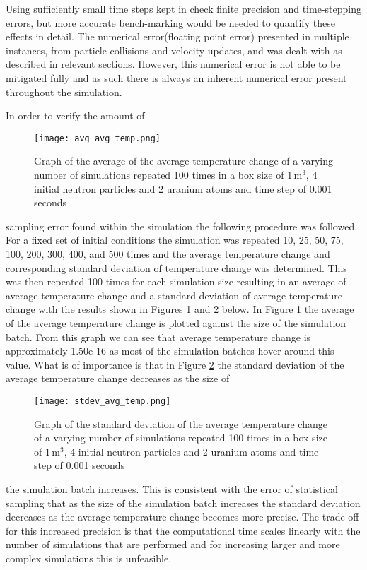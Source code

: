 \documentclass[twocolumn, 11pt]{article}
\begin{document}
Using sufficiently small time steps kept in check finite precision and time-stepping errors, but more accurate bench-marking would be needed to quantify these effects in detail. The numerical error(floating point error) presented in multiple instances, from particle collisions and velocity updates, and was dealt with as described in relevant sections. However, this numerical error is not able to be mitigated fully and as such there is always an inherent numerical error present throughout the simulation. 

In order to verify the amount of 
\begin{figure}[h]
    \centering
    \texttt{[image: avg\_avg\_temp.png]}
    \caption{Graph of the average of the average temperature change of a varying number of simulations repeated 100 times in a box size of \(1 \,\text{m}^3\), 4 initial neutron particles and 2 uranium atoms and time step of 0.001 seconds}
    \label{fig:avg_avg_analysis}
\end{figure}
sampling error found within the simulation the following procedure was followed. For a fixed set of initial conditions the simulation was repeated 10, 25, 50, 75, 100, 200, 300, 400, and 500 times and the average temperature change and corresponding standard deviation of temperature change was determined. This was then repeated 100 times for each simulation size resulting in an average of average temperature change and a standard deviation of average temperature change with the results shown in Figures \ref{fig:avg_avg_analysis} and \ref{fig:stdev_avg_analysis} below.
In Figure \ref{fig:avg_avg_analysis} the average of the average temperature change is plotted against the size of the simulation batch. From this graph we can see that average temperature change is approximately 1.50e-16 as most of the simulation batches hover around this value. What is of importance is that in Figure \ref{fig:stdev_avg_analysis} the standard deviation of the average temperature change decreases as the size of 
\begin{figure}[h]
    \centering
    \texttt{[image: stdev\_avg\_temp.png]}
    \caption{Graph of the standard deviation of the average temperature change of a varying number of simulations repeated 100 times in a box size of \(1 \,\text{m}^3\), 4 initial neutron particles and 2 uranium atoms and time step of 0.001 seconds}
    \label{fig:stdev_avg_analysis}
\end{figure}
 the simulation batch increases. This is consistent with the error of statistical sampling that as the size of the simulation batch increases the standard deviation decreases as the average temperature change becomes more precise. The trade off for this increased precision is that the computational time scales linearly with the number of simulations that are performed and for increasing larger and more complex simulations this is unfeasible. 
\end{document}
